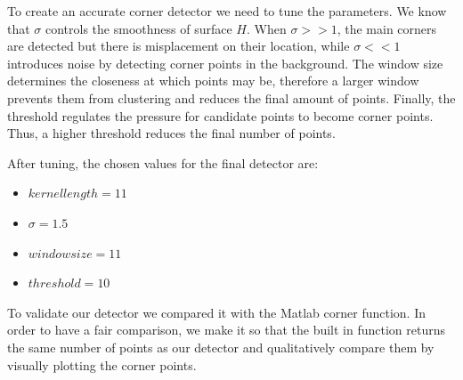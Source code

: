 \documentclass[11pt]{article}
\begin{document}
To create an accurate corner detector we need to tune the parameters. We know that $\sigma$ controls the smoothness of surface $H$. When $\sigma >> 1$, the main corners are detected but there is misplacement on their location, while $\sigma << 1$ introduces noise by detecting corner points in the background. The window size determines the closeness at which points may be, therefore a larger window prevents them from clustering and reduces the final amount of points. Finally, the threshold regulates the pressure for candidate points to become corner points. Thus, a higher threshold reduces the final number of points.
 
After tuning, the chosen values for the final detector are:
\begin{itemize}
	\item $kernel  length = 11$
	\item $\sigma = 1.5$
	\item $window  size = 11$
	\item $threshold = 10$
\end{itemize}

To validate our detector we compared it with the Matlab corner function. In order to have a fair comparison, we make it so that the built in function returns the same number of points as our detector and qualitatively compare them by visually plotting the corner points.
 
\end{document}
